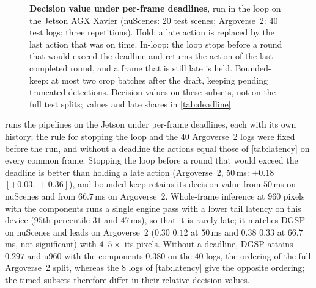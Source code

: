 \documentclass[10pt,letterpaper]{article}
\newcommand{\method}{DGSP\xspace}
\newcommand{\ci}[2]{[#1,\allowbreak\,#2]}
\theoremstyle{remark}
\theoremstyle{plain}
\theoremstyle{definition}
\begin{document}
\begin{figure}[!htbp]
\vspace{2pt}
\caption{\textbf{Decision value under per-frame deadlines}, run in the loop on the Jetson AGX Xavier (nuScenes: $20$ test scenes; Argoverse~2: $40$ test logs; three repetitions). Hold: a late action is replaced by the last action that was on time. In-loop: the loop stops before a round that would exceed the deadline and returns the action of the last completed round, and a frame that is still late is held. Bounded-keep: at most two crop batches after the draft, keeping pending truncated detections. Decision values on these subsets, not on the full test splits; values and late shares in \cref{tab:deadline}.}
\label{fig:deadline}
\end{figure}

 runs the pipelines on the Jetson under per-frame deadlines, each with its own history; the rule for stopping the loop and the $40$ Argoverse~2 logs were fixed before the run, and without a deadline the actions equal those of \cref{tab:latency} on every common frame.
Stopping the loop before a round that would exceed the deadline is better than holding a late action (Argoverse~2, $50$\,ms: $+0.18$ $\ci{+0.03}{+0.36}$), and bounded-keep retains its decision value from $50$\,ms on nuScenes and from $66.7$\,ms on Argoverse~2.
Whole-frame inference at $960$ pixels with the components runs a single engine pass with a lower tail latency on this device ($95$th percentile $31$ and $47$\,ms), so that it is rarely late; it matches \method on nuScenes and leads on Argoverse~2 ($0.30$ \vs $0.12$ at $50$\,ms and $0.38$ \vs $0.33$ at $66.7$\,ms, not significant) with $4$--$5\times$ its pixels.
Without a deadline, \method attains $0.297$ and u960 with the components $0.380$ on the $40$ logs, the ordering of the full Argoverse~2 split, whereas the $8$ logs of \cref{tab:latency} give the opposite ordering; the timed subsets therefore differ in their relative decision values.
\end{document}

